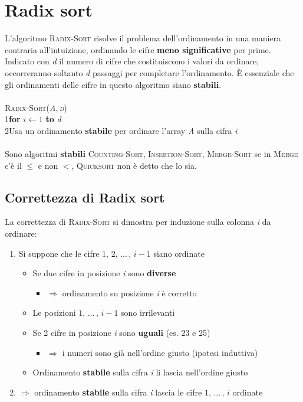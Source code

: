 \documentclass[10pt, a4paper]{report}
\newcommand\firsttab[1][0.5cm]{\hspace*{#1}}
\newcommand\secondtab[1][1cm]{\hspace*{#1}}
\begin{document}
\section{Radix sort}
L'algoritmo \textsc{Radix-Sort} risolve il problema dell'ordinamento in una maniera contraria all'intuizione, ordinando le cifre \textbf{meno significative} per prime. Indicato con \textit{d} il numero di cifre che costituiscono i valori da ordinare, occorreranno soltanto \textit{d} passaggi per completare l'ordinamento. È essenziale che gli ordinamenti delle cifre in questo algoritmo siano \textbf{stabili}.\\\\
\textsc{Radix-Sort(\textit{A},\,\textit{d})}\\
1\firsttab\textbf{for} $i \leftarrow 1$ \textbf{to} \textit{d} \\
2\secondtab Usa un ordinamento \textbf{stabile} per ordinare l'array \textit{A} sulla cifra \textit{i}\\\\
Sono algoritmi \textbf{stabili} \textsc{Counting-Sort}, \textsc{Insertion-Sort}, \textsc{Merge-Sort} se in \textsc{Merge} c'è il $\leq$ e non $<$, \textsc{Quicksort} non è detto che lo sia.
\subsection{Correttezza di Radix sort}
La correttezza di \textsc{Radix-Sort} si dimostra per induzione sulla colonna \textit{i} da ordinare:
\begin{enumerate}
\item Si suppone che le cifre $1,\,2,\,...\,,\,i - 1$ siano ordinate
\begin{itemize}
\item Se due cifre in posizione \textit{i} sono \textbf{diverse}
\begin{itemize}
\item[]$\Rightarrow$ ordinamento su posizione \textit{i} è corretto
\end{itemize}
\item[]Le posizioni $1,\,...\,,\,i - 1$ sono irrilevanti
\item Se 2 cifre in posizione \textit{i} sono \textbf{uguali} (es. 23 e 25)
\begin{itemize}
\item[]$\Rightarrow$ i numeri sono già nell'ordine giusto (ipotesi induttiva)
\end{itemize}
\item[]Ordinamento \textbf{stabile} sulla cifra \textit{i} li lascia nell'ordine giusto
\end{itemize}
\item$\Rightarrow$ ordinamento \textbf{stabile} sulla cifra \textit{i} lascia le cifre $1,\,...\,,\,i$ ordinate
\end{enumerate}
\end{document}
